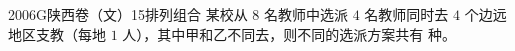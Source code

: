 
\begin{problem}{2006}{G}{陕西卷（文）}{15}{排列组合}
某校从 $ 8 $ 名教师中选派 $ 4 $ 名教师同时去 $ 4 $ 个边远地区支教（每地 $ 1 $ 人），其中甲和乙不同去，则不同的选派方案共有 \underline{\hspace{4em}} 种。
\end{problem}

\begin{answer}

\end{answer}

\begin{solutions}

\end{solutions}